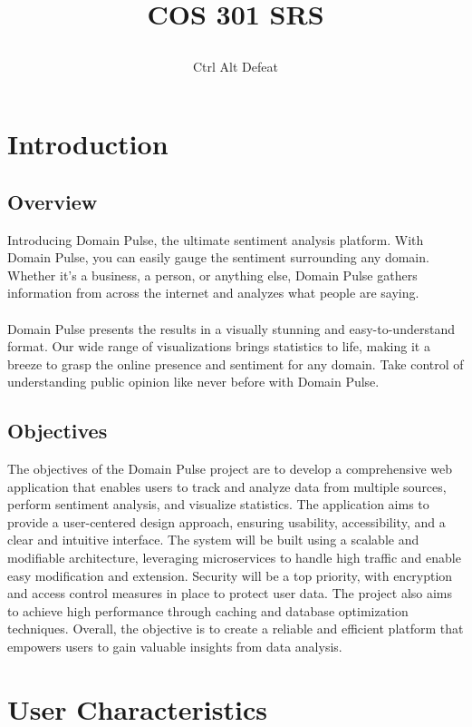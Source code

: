 \documentclass[12pt]{article}
\title{

\\
{COS 301 SRS}
}
\author{Ctrl Alt Defeat}
\begin{document}


\tableofcontents

\newpage

\section{Introduction}

\subsection{Overview}

Introducing Domain Pulse, the ultimate sentiment analysis platform. With Domain Pulse, you can easily gauge the sentiment surrounding any domain. Whether it's a business, a person, or anything else, Domain Pulse gathers information from across the internet and analyzes what people are saying.
\\\\Domain Pulse presents the results in a visually stunning and easy-to-understand format. Our wide range of visualizations brings statistics to life, making it a breeze to grasp the online presence and sentiment for any domain. Take control of understanding public opinion like never before with Domain Pulse.

\subsection{Objectives}

The objectives of the Domain Pulse project are to develop a comprehensive web application that enables users to track and analyze data from multiple sources, perform sentiment analysis, and visualize statistics. The application aims to provide a user-centered design approach, ensuring usability, accessibility, and a clear and intuitive interface. The system will be built using a scalable and modifiable architecture, leveraging microservices to handle high traffic and enable easy modification and extension. Security will be a top priority, with encryption and access control measures in place to protect user data. The project also aims to achieve high performance through caching and database optimization techniques. Overall, the objective is to create a reliable and efficient platform that empowers users to gain valuable insights from data analysis.

\newpage

\section{User Characteristics}
\end{document}
